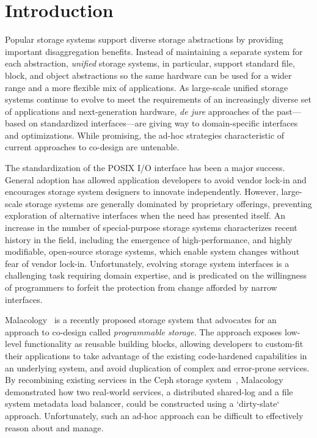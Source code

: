 \section{Introduction}
\label{sec:intro}

Popular storage systems support diverse storage abstractions by
providing important disaggregation benefits. Instead of maintaining
a separate system for each abstraction, \emph{unified} storage
systems, in particular, support standard file, block, and object abstractions so the same
hardware can be used for a wider range and a more flexible mix of applications. 
As large-scale unified storage systems continue to evolve to meet the requirements 
of an increasingly diverse set of applications and next-generation hardware, \emph{de jure}
approaches of the past---based on standardized interfaces---are giving way to
domain-specific interfaces and optimizations. While promising, the ad-hoc strategies characteristic of 
current approaches to co-design are untenable.

The standardization of the POSIX I/O interface has been a major success. General adoption
has allowed application developers to avoid vendor lock-in and encourages storage system
designers to innovate independently. However, large-scale storage systems are generally dominated 
by proprietary offerings, preventing exploration of alternative
interfaces when the need has presented itself. An increase in the number of special-purpose storage systems characterizes recent history
in the field, including the emergence of high-performance, and highly modifiable, open-source storage systems, 
which enable system changes without fear of vendor lock-in. Unfortunately, evolving storage system
interfaces is a challenging task requiring domain expertise, and is predicated on the willingness of
programmers to forfeit the protection from change afforded by narrow
interfaces.

Malacology~\cite{sevilla:eurosys17} is a recently proposed storage system that
advocates for an approach to co-design called \emph{programmable storage}. The
approach exposes low-level functionality as reusable building
blocks, allowing developers to custom-fit their applications to take advantage
of the existing code-hardened capabilities in an underlying system, and avoid
duplication of complex and error-prone services. By recombining existing
services in the Ceph storage system~\cite{weil:osdi2006-ceph}, Malacology
demonstrated how two
real-world services, a distributed shared-log and a file system metadata load
balancer, could be constructed using a `dirty-slate` approach. Unfortunately,
such an ad-hoc approach can be difficult to effectively reason about and manage.

